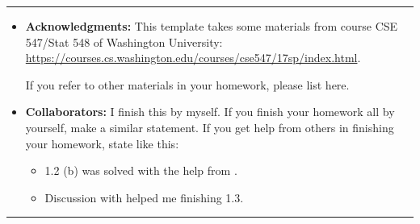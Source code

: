 \rule{\textwidth}{1pt}
\begin{itemize}
\item {\bf Acknowledgments: \/} 
  This template takes some materials from course CSE 547/Stat 548 of Washington University: \small{\url{https://courses.cs.washington.edu/courses/cse547/17sp/index.html}}.

  If you refer to other materials in your homework, please list here.
\item {\bf Collaborators: \/}
  I finish this \underline{\hspace{3em}} by myself. If you finish your homework all by yourself, make a similar statement. If you get help from others in finishing your homework, state like this:
  \begin{itemize}
  \item 1.2 (b) was solved with the help from \underline{\hspace{3em}}.
  \item Discussion with \underline{\hspace{3em}} helped me finishing 1.3.
  \end{itemize}
\end{itemize}
\rule{\textwidth}{1pt}

\vspace{2em}
